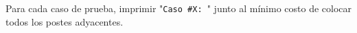 Para cada caso de prueba, imprimir "\texttt{Caso #X: }" junto al mínimo costo de colocar todos los postes adyacentes.
